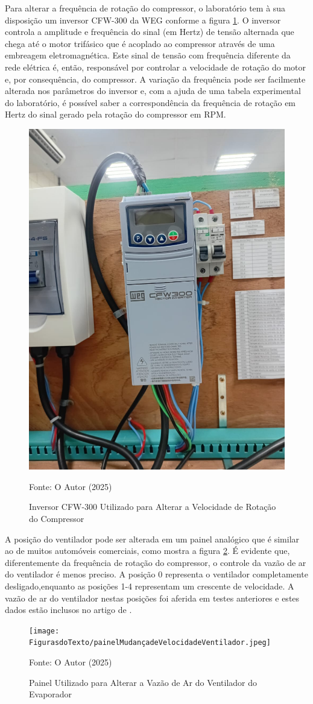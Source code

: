 Para alterar a frequência de rotação do compressor, o laboratório \textcite{reve2023} tem à sua disposição um inversor CFW-300 da WEG conforme a figura \ref{fig:inversor CFW-300}. O inversor controla a amplitude e frequência do sinal (em Hertz) de tensão alternada que chega até o motor trifásico que é acoplado ao compressor através de uma embreagem eletromagnética. Este sinal de tensão com frequência diferente da rede elétrica é, então, responsável por controlar a velocidade de rotação do motor e, por consequência, do compressor. A variação da frequência pode ser facilmente alterada nos parâmetros do inversor e, com a ajuda de uma tabela experimental do laboratório, é possível saber a correspondência da frequência de rotação em Hertz do sinal gerado pela rotação do compressor em RPM.

\begin{figure}[h]
    \centering
    \includegraphics[width=0.45\linewidth]{FigurasdoTexto/inversorcfw-300.jpeg}
    \caption{Inversor CFW-300 Utilizado para Alterar a Velocidade de Rotação do Compressor}
    \label{fig:inversor CFW-300}
    {\footnotesize Fonte: O Autor (2025)}
\end{figure}

A posição do ventilador pode ser alterada em um painel analógico que é similar ao de muitos automóveis comerciais, como mostra a figura \ref{fig:painelMudançadeVelocidadeVentilador}. É evidente que, diferentemente da frequência de rotação do compressor, o controle da vazão de ar do ventilador é menos preciso. A posição 0 representa o ventilador completamente desligado,enquanto as posições 1-4 representam um crescente de velocidade. A vazão de ar do ventilador nestas posições foi aferida em testes anteriores e estes dados estão inclusos no artigo de \textcite{ExperimentalThermalPerformance}.
\newpage
\begin{figure}[h]
    \centering
    \texttt{[image: FigurasdoTexto/painelMudançadeVelocidadeVentilador.jpeg]}
    \caption{Painel Utilizado para Alterar a Vazão de Ar do Ventilador do Evaporador}
    \label{fig:painelMudançadeVelocidadeVentilador}

    {\footnotesize Fonte: O Autor (2025)}

\end{figure}

